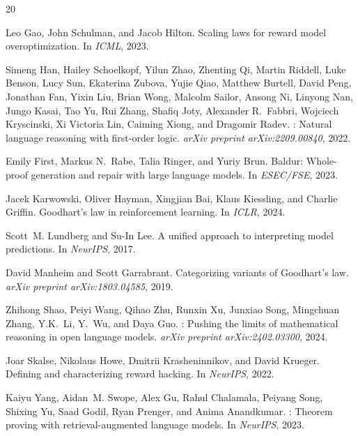 \documentclass[11pt,a4paper]{article}
\begin{document}
\begin{thebibliography}{20}

Leo Gao, John Schulman, and Jacob Hilton.
\newblock Scaling laws for reward model overoptimization.
\newblock In \emph{ICML}, 2023.

Simeng Han, Hailey Schoelkopf, Yilun Zhao, Zhenting Qi, Martin Riddell, Luke Benson, Lucy Sun, Ekaterina Zubova, Yujie Qiao, Matthew Burtell, David Peng, Jonathan Fan, Yixin Liu, Brian Wong, Malcolm Sailor, Ansong Ni, Linyong Nan, Jungo Kasai, Tao Yu, Rui Zhang, Shafiq Joty, Alexander R.\ Fabbri, Wojciech Kryscinski, Xi Victoria Lin, Caiming Xiong, and Dragomir Radev.
: Natural language reasoning with first-order logic.
\newblock \emph{arXiv preprint arXiv:2209.00840}, 2022.

Emily First, Markus N.\ Rabe, Talia Ringer, and Yuriy Brun.
\newblock Baldur: Whole-proof generation and repair with large language models.
\newblock In \emph{ESEC/FSE}, 2023.

Jacek Karwowski, Oliver Hayman, Xingjian Bai, Klaus Kiessling, and Charlie Griffin.
\newblock Goodhart's law in reinforcement learning.
\newblock In \emph{ICLR}, 2024.

Scott~M. Lundberg and Su-In Lee.
\newblock A unified approach to interpreting model predictions.
\newblock In \emph{NeurIPS}, 2017.

David Manheim and Scott Garrabrant.
\newblock Categorizing variants of {G}oodhart's law.
\newblock \emph{arXiv preprint arXiv:1803.04585}, 2019.

Zhihong Shao, Peiyi Wang, Qihao Zhu, Runxin Xu, Junxiao Song, Mingchuan Zhang, Y.K.\ Li, Y.\ Wu, and Daya Guo.
: Pushing the limits of mathematical reasoning in open language models.
\newblock \emph{arXiv preprint arXiv:2402.03300}, 2024.

Joar Skalse, Nikolaus Howe, Dmitrii Krasheninnikov, and David Krueger.
\newblock Defining and characterizing reward hacking.
\newblock In \emph{NeurIPS}, 2022.

Kaiyu Yang, Aidan~M. Swope, Alex Gu, Rahul Chalamala, Peiyang Song, Shixing Yu, Saad Godil, Ryan Prenger, and Anima Anandkumar.
: Theorem proving with retrieval-augmented language models.
\newblock In \emph{NeurIPS}, 2023.

\end{thebibliography}
\end{document}
